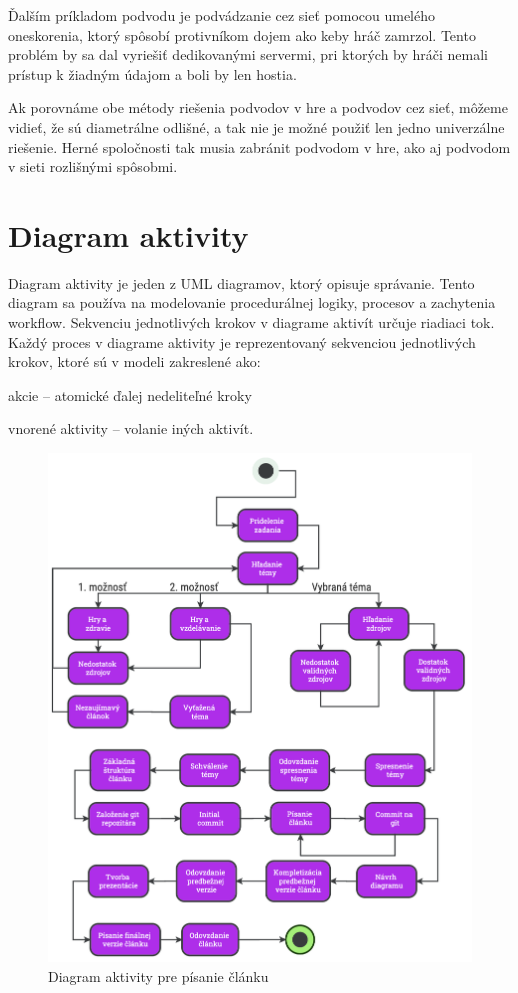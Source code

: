 \documentclass[10pt,twoside,slovak,a4paper]{article}
\begin{document}
Ďalším príkladom podvodu je podvádzanie cez sieť pomocou umelého oneskorenia, ktorý spôsobí protivníkom dojem ako keby hráč zamrzol. Tento problém by sa dal vyriešiť dedikovanými servermi, pri ktorých by hráči nemali prístup k žiadným údajom a boli by len hostia. 

Ak porovnáme obe métody riešenia podvodov v hre a podvodov cez sieť, môžeme vidieť, že sú diametrálne odlišné, a tak nie je možné použiť len jedno univerzálne riešenie. Herné spoločnosti tak musia zabránit podvodom v hre, ako aj podvodom v sieti rozlišnými spôsobmi.\cite{solve}

\newpage


\section{Diagram aktivity}\label{uxfavod}

Diagram aktivity je jeden z UML diagramov, ktorý opisuje správanie. Tento diagram sa používa na modelovanie procedurálnej logiky, procesov a zachytenia workflow. Sekvenciu jednotlivých krokov v diagrame aktivít určuje riadiaci tok. Každý proces v diagrame aktivity je reprezentovaný sekvenciou jednotlivých krokov, ktoré sú v modeli zakreslené ako:

akcie – atomické ďalej nedeliteľné kroky


vnorené aktivity – volanie iných aktivít.

\begin{figure}[h]
    \centering
    \includegraphics[scale = 0.65]{diagram.png}
    \caption{Diagram aktivity pre písanie článku}
    \label{fig:mesh1}
\end{figure}
\end{document}
